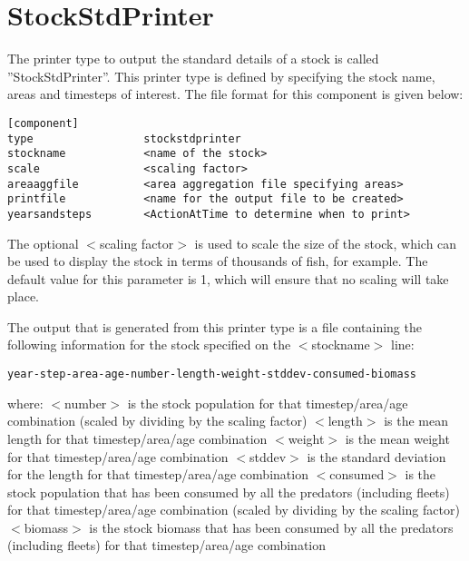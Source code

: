 \documentclass [a4paper, 10pt]{book}
\begin{document}
\newpage %
\section{StockStdPrinter}\label{sec:stockstdprinter}
The printer type to output the standard details of a stock is called ''StockStdPrinter''.  This printer type is defined by specifying the stock name, areas and timesteps of interest.  The file format for this component is given below:

{\small\begin{verbatim}
[component]
type                 stockstdprinter
stockname            <name of the stock>
scale                <scaling factor>
areaaggfile          <area aggregation file specifying areas>
printfile            <name for the output file to be created>
yearsandsteps        <ActionAtTime to determine when to print>
\end{verbatim}}

The optional $<$scaling factor$>$ is used to scale the size of the stock, which can be used to display the stock in terms of thousands of fish, for example.  The default value for this parameter is 1, which will ensure that no scaling will take place.

\bigskip
The output that is generated from this printer type is a file containing the following information for the stock specified on the $<$stockname$>$ line:

{\small\begin{verbatim}
year-step-area-age-number-length-weight-stddev-consumed-biomass
\end{verbatim}}

where:\newline
$<$number$>$ is the stock population for that timestep/area/age combination (scaled by dividing by the scaling factor)\newline
$<$length$>$ is the mean length for that timestep/area/age combination\newline
$<$weight$>$ is the mean weight for that timestep/area/age combination\newline
$<$stddev$>$ is the standard deviation for the length for that timestep/area/age combination\newline
$<$consumed$>$ is the stock population that has been consumed by all the predators (including fleets) for that timestep/area/age combination (scaled by dividing by the scaling factor)\newline
$<$biomass$>$ is the stock biomass that has been consumed by all the predators (including fleets) for that timestep/area/age combination
\end{document}
